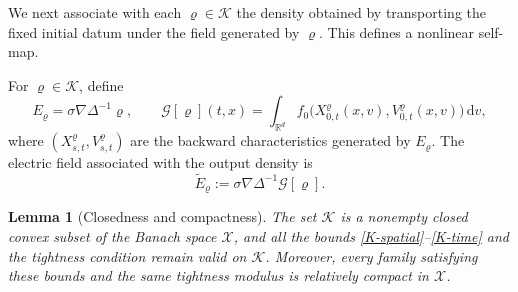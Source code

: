 \documentclass[11pt]{article}
\newtheorem{lemma}[theorem]{Lemma}
\newcommand{\R}{\mathbb R}
\newcommand{\dd}{\,\mathrm d}
\begin{document}
We next associate with each $\varrho\in\mathcal K$ the
density obtained by transporting the fixed initial datum under the field
generated by $\varrho$.  This defines a nonlinear self-map.

For $\varrho\in\mathcal K$, define
\begin{equation}\label{fixedpointmap}
 E_\varrho=\sigma\nabla\Delta^{-1}\varrho,
 \qquad
 \mathcal G[\varrho](t,x)
 =\int_{\R^d} f_0\bigl(X_{0,t}^\varrho(x,v),
                           V_{0,t}^\varrho(x,v)\bigr)\dd v,
\end{equation}
where $(X_{s,t}^\varrho,V_{s,t}^\varrho)$ are the backward characteristics
generated by $E_\varrho$.  The electric field associated with the output
density is
\begin{equation}\label{output-field}
 \widetilde E_\varrho
 :=\sigma\nabla\Delta^{-1}\mathcal G[\varrho].
\end{equation}

\begin{lemma}[Closedness and compactness]
\label{lem:compactness}
The set $\mathcal K$ is a nonempty closed convex subset of the Banach space
$\mathcal X$, and all the bounds
\eqref{K-spatial}--\eqref{K-time} and the tightness condition remain valid
on $\mathcal K$.  Moreover, every family satisfying these bounds and the
same tightness modulus is relatively compact in $\mathcal X$.
\end{lemma}
\end{document}
